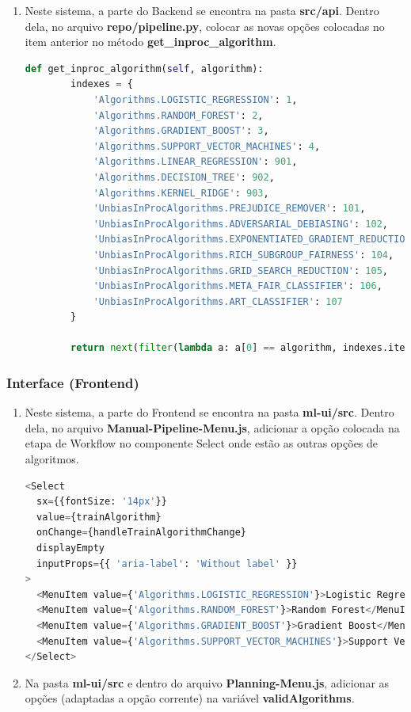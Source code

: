 \documentclass[portugues]{ic-tese}
\begin{document}
\begin{enumerate}
\item Neste sistema, a parte do Backend se encontra na pasta \textbf{src/api}. Dentro dela, no arquivo \textbf{repo/pipeline.py}, colocar as novas opções colocadas no item anterior no método \textbf{get\_inproc\_algorithm}.

\begin{lstlisting}[language=Python, label=cod:getInprocAlgorithm]
    def get_inproc_algorithm(self, algorithm):
        indexes = {
            'Algorithms.LOGISTIC_REGRESSION': 1,
            'Algorithms.RANDOM_FOREST': 2,
            'Algorithms.GRADIENT_BOOST': 3,
            'Algorithms.SUPPORT_VECTOR_MACHINES': 4,
            'Algorithms.LINEAR_REGRESSION': 901,
            'Algorithms.DECISION_TREE': 902,
            'Algorithms.KERNEL_RIDGE': 903,
            'UnbiasInProcAlgorithms.PREJUDICE_REMOVER': 101,
            'UnbiasInProcAlgorithms.ADVERSARIAL_DEBIASING': 102,
            'UnbiasInProcAlgorithms.EXPONENTIATED_GRADIENT_REDUCTION': 103,
            'UnbiasInProcAlgorithms.RICH_SUBGROUP_FAIRNESS': 104,
            'UnbiasInProcAlgorithms.GRID_SEARCH_REDUCTION': 105,
            'UnbiasInProcAlgorithms.META_FAIR_CLASSIFIER': 106,
            'UnbiasInProcAlgorithms.ART_CLASSIFIER': 107
        }

        return next(filter(lambda a: a[0] == algorithm, indexes.items()))[1]
\end{lstlisting}
\end{enumerate}

\subsubsection{Interface (Frontend)}

\begin{enumerate}
\item Neste sistema, a parte do Frontend se encontra na pasta \textbf{ml-ui/src}. Dentro dela, no arquivo \textbf{Manual-Pipeline-Menu.js}, adicionar a opção colocada na etapa de Workflow no componente Select onde estão as outras opções de algoritmos.

\begin{lstlisting}[language=Python, label=cod:AddAlgorithmManual]
<Select
  sx={{fontSize: '14px'}}
  value={trainAlgorithm}
  onChange={handleTrainAlgorithmChange}
  displayEmpty
  inputProps={{ 'aria-label': 'Without label' }}
>
  <MenuItem value={'Algorithms.LOGISTIC_REGRESSION'}>Logistic Regression</MenuItem>
  <MenuItem value={'Algorithms.RANDOM_FOREST'}>Random Forest</MenuItem>
  <MenuItem value={'Algorithms.GRADIENT_BOOST'}>Gradient Boost</MenuItem>
  <MenuItem value={'Algorithms.SUPPORT_VECTOR_MACHINES'}>Support Vector Machines</MenuItem>
</Select>
\end{lstlisting}

\item Na pasta \textbf{ml-ui/src} e dentro do arquivo \textbf{Planning-Menu.js}, adicionar as opções (adaptadas a opção corrente) na variável \textbf{validAlgorithms}.
\end{enumerate}
\end{document}
